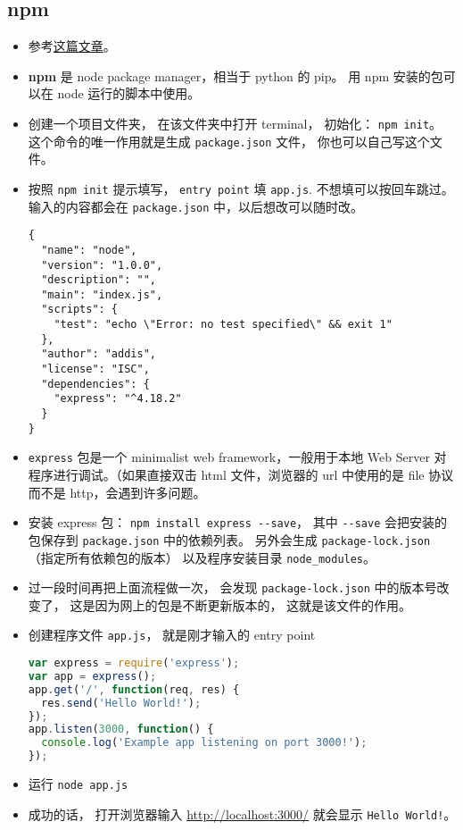 \subsection{npm}
\begin{itemize}
\item 参考\href{https://medium.com/@adnanrahic/hello-world-app-with-node-js-and-express-c1eb7cfa8a30}{这篇文章}。
\item \textbf{npm} 是 node package manager，相当于 python 的 pip。 用 npm 安装的包可以在 node 运行的脚本中使用。
\item 创建一个项目文件夹， 在该文件夹中打开 terminal， 初始化： \verb`npm init`。 这个命令的唯一作用就是生成 \verb`package.json` 文件， 你也可以自己写这个文件。
\item 按照 \verb`npm init` 提示填写， \verb`entry point` 填 \verb`app.js`. 不想填可以按回车跳过。 输入的内容都会在 \verb`package.json` 中，以后想改可以随时改。
\begin{lstlisting}[language=none,caption=package.json 示例]
{
  "name": "node",
  "version": "1.0.0",
  "description": "",
  "main": "index.js",
  "scripts": {
    "test": "echo \"Error: no test specified\" && exit 1"
  },
  "author": "addis",
  "license": "ISC",
  "dependencies": {
    "express": "^4.18.2"
  }
}
\end{lstlisting}
\item \verb`express` 包是一个 minimalist web framework，一般用于本地 Web Server 对程序进行调试。（如果直接双击 html 文件，浏览器的 url 中使用的是 file 协议而不是 http，会遇到许多问题。
\item 安装 express 包： \verb`npm install express --save`， 其中 \verb`--save` 会把安装的包保存到 \verb`package.json` 中的依赖列表。 另外会生成 \verb`package-lock.json` （指定所有依赖包的版本） 以及程序安装目录 \verb`node_modules`。
\item 过一段时间再把上面流程做一次， 会发现 \verb`package-lock.json` 中的版本号改变了， 这是因为网上的包是不断更新版本的， 这就是该文件的作用。
\item 创建程序文件 \verb`app.js`， 就是刚才输入的 entry point
\begin{lstlisting}[language=js]
var express = require('express');
var app = express();
app.get('/', function(req, res) {
  res.send('Hello World!');
});
app.listen(3000, function() {
  console.log('Example app listening on port 3000!');
});
\end{lstlisting}
\item 运行 \verb`node app.js`
\item 成功的话， 打开浏览器输入 \href{http://localhost:3000/}{http://localhost:3000/} 就会显示 \verb`Hello World!`。
\end{itemize}

